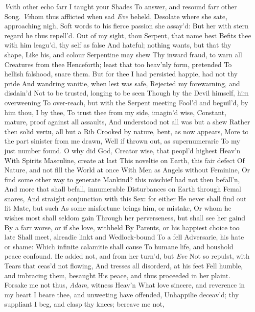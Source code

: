 \documentclass[11pt]{book}
\newcounter {last}
\begin{document}
\textit{Vv}ith other echo farr I taught your Shades 
To answer, and resound farr other Song. 
\textit{Vv}hom thus afflicted when sad \textit{Eve} beheld, 
Desolate where she sate, approaching nigh, 
Soft words to his fierce passion she assay'd: 
But her with stern regard he thus repell'd. 
\quad Out of my sight, thou Serpent, that name best 
Befits thee with him leagu'd, thy self as false 
And hateful; nothing wants, but that thy shape, 
Like his, and colour Serpentine may shew 
Thy inward fraud, to warn all Creatures from thee 
Henceforth; least that too heav'nly form, pretended 
To hellish falshood, snare them.  But for thee 
I had persisted happie, had not thy pride 
And wandring vanitie, when lest was safe, 
Rejected my forewarning, and disdain'd 
Not to be trusted, longing to be seen 
Though by the Devil himself, him overweening 
To over-reach, but with the Serpent meeting 
Fool'd and beguil'd, by him thou, I by thee, 
To trust thee from my side, imagin'd wise, 
Constant, mature, proof against all assaults, 
And understood not all was but a shew 
Rather then solid vertu, all but a Rib 
Crooked by nature, bent, as now appears, 
More to the part sinister from me drawn, 
Well if thrown out, as supernumerarie 
To my just number found.  O why did God, 
Creator wise, that peopl'd highest Heav'n 
With Spirits Masculine, create at last 
This noveltie on Earth, this fair defect 
Of Nature, and not fill the World at once 
With Men as Angels without Feminine, 
Or find some other way to generate 
Mankind? this mischief had not then befall'n, 
And more that shall befall, innumerable 
Disturbances on Earth through Femal snares, 
And straight conjunction with this Sex: for either 
He never shall find out fit Mate, but such 
As some misfortune brings him, or mistake, 
Or whom he wishes most shall seldom gain 
Through her perverseness, but shall see her gaind 
By a farr worse, or if she love, withheld 
By Parents, or his happiest choice too late 
Shall meet, alreadie linkt and Wedlock-bound 
To a fell Adversarie, his hate or shame: 
Which infinite calamitie shall cause 
To humane life, and houshold peace confound. 
\quad He added not, and from her turn'd, but \textit{Eve} 
Not so repulst, with Tears that ceas'd not flowing, 
And tresses all disorderd, at his feet 
Fell humble, and imbracing them, besaught 
His peace, and thus proceeded in her plaint. 
\quad Forsake me not thus, \textit{Adam}, witness Heav'n 
What love sincere, and reverence in my heart 
I beare thee, and unweeting have offended, 
Unhappilie deceav'd; thy suppliant 
I beg, and clasp thy knees; bereave me not, 
\end{document}
